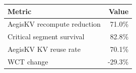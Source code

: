 \begin{tabular}{lr}
\toprule
Metric & Value \\
\midrule
AegisKV recompute reduction & 71.0\% \\
Critical segment survival & 82.8\% \\
AegisKV KV reuse rate & 70.1\% \\
WCT change & -29.3\% \\
\bottomrule
\end{tabular}
